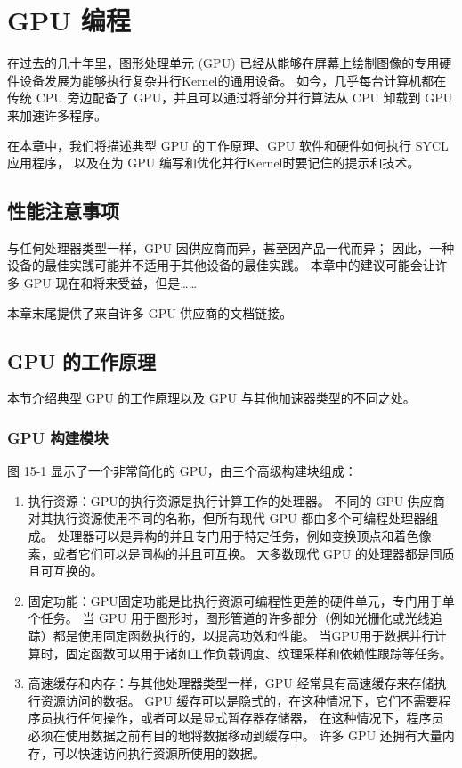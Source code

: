 \section{GPU 编程}
在过去的几十年里，图形处理单元 (GPU) 已经从能够在屏幕上绘制图像的专用硬件设备发展为能够执行复杂并行Kernel的通用设备。 
如今，几乎每台计算机都在传统 CPU 旁边配备了 GPU，并且可以通过将部分并行算法从 CPU 卸载到 GPU 来加速许多程序。

在本章中，我们将描述典型 GPU 的工作原理、GPU 软件和硬件如何执行 SYCL 应用程序，
以及在为 GPU 编写和优化并行Kernel时要记住的提示和技术。

\subsection{性能注意事项}
与任何处理器类型一样，GPU 因供应商而异，甚至因产品一代而异； 
因此，一种设备的最佳实践可能并不适用于其他设备的最佳实践。 
本章中的建议可能会让许多 GPU 现在和将来受益，但是……

本章末尾提供了来自许多 GPU 供应商的文档链接。

\subsection{GPU 的工作原理}
本节介绍典型 GPU 的工作原理以及 GPU 与其他加速器类型的不同之处。

\subsubsection{GPU 构建模块}
图 15-1 显示了一个非常简化的 GPU，由三个高级构建块组成：

\begin{enumerate}
	\item 执行资源：GPU的执行资源是执行计算工作的处理器。 
不同的 GPU 供应商对其执行资源使用不同的名称，但所有现代 GPU 都由多个可编程处理器组成。 
处理器可以是异构的并且专门用于特定任务，例如变换顶点和着色像素，或者它们可以是同构的并且可互换。 
大多数现代 GPU 的处理器都是同质且可互换的。

	\item 固定功能：GPU固定功能是比执行资源可编程性更差的硬件单元，专门用于单个任务。 
当 GPU 用于图形时，图形管道的许多部分（例如光栅化或光线追踪）都是使用固定函数执行的，以提高功效和性能。 
当GPU用于数据并行计算时，固定函数可以用于诸如工作负载调度、纹理采样和依赖性跟踪等任务。

	\item 高速缓存和内存：与其他处理器类型一样，GPU 经常具有高速缓存来存储执行资源访问的数据。 
GPU 缓存可以是隐式的，在这种情况下，它们不需要程序员执行任何操作，或者可以是显式暂存器存储器，
在这种情况下，程序员必须在使用数据之前有目的地将数据移动到缓存中。 
许多 GPU 还拥有大量内存，可以快速访问执行资源所使用的数据。
\end{enumerate}

